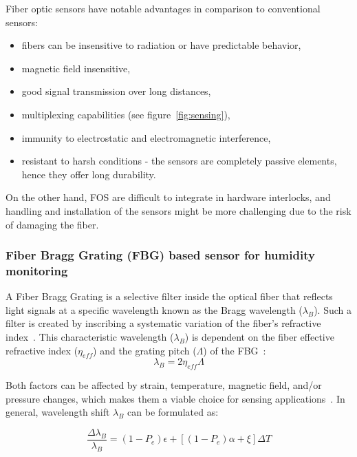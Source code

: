 Fiber optic sensors have notable advantages in comparison to conventional sensors:

\begin{itemize}
    \item fibers can be insensitive to radiation or have predictable behavior,
    \item magnetic field insensitive,
    \item good signal transmission over long distances,
    \item multiplexing capabilities (see figure~\ref{fig:sensing}),
    \item immunity to electrostatic and electromagnetic interference,
    \item resistant to harsh conditions - the sensors are completely passive elements, hence they offer long durability.
\end{itemize}

On the other hand, \gls{FOS} are difficult to integrate in hardware interlocks, and handling and installation of the sensors might be more challenging due to the risk of damaging the fiber.




\subsubsection{Fiber Bragg Grating (FBG) based sensor for humidity monitoring }
\label{fbg}
A Fiber Bragg Grating is a selective filter inside the optical fiber that reflects light signals at a specific wavelength known as the Bragg wavelength ($\lambda_{B}$). Such a filter is created by inscribing a systematic variation of the fiber's refractive index~\cite{fbg_overview}. This characteristic wavelength ($\lambda_{B}$) is dependent on the fiber effective refractive index ($\eta_{eff}$) and the grating pitch ($\Lambda$) of the \gls{FBG}~\cite{Othonos2000FiberBG}:
\begin{equation}
    \lambda_{B} = 2 \eta_{eff} \Lambda
\end{equation}

Both factors can be affected by strain, temperature, magnetic field, and/or pressure changes, which makes them a viable choice for sensing applications~\cite{Yun-Jiang_Rao_1997}. In general, wavelength shift $\lambda_{B}$ can be formulated as:

\begin{equation}
    \frac{\Delta\lambda_{B}}{\lambda_{B}}=(1-P_{e}) \epsilon + \left [(1-P_{e}) \alpha + \xi  \right ] \Delta T
\end{equation}

